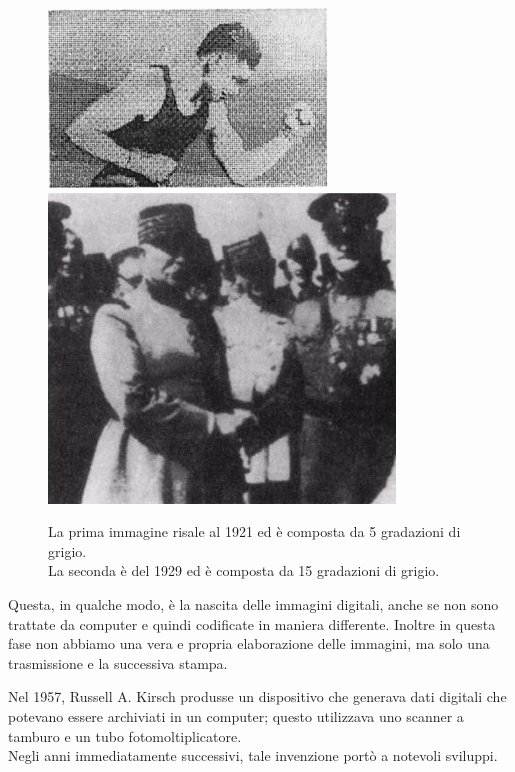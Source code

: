\begin{figure}[htb] \centering
\includegraphics[scale=0.5, trim = 0 1.1cm 0 0, clip]{Pictures/img del 1921 a 5 gradazioni di grigio.jpg}
\qquad\qquad
\includegraphics[scale=1.7, trim = 0 1.1cm 0 0, clip]{Pictures/img del 1929 a 15 gradazioni di grigio.jpg}
\caption{La prima immagine risale al 1921 ed è composta da 5 gradazioni di grigio.\\ 
La seconda è del 1929 ed è composta da 15 gradazioni di grigio.}\label{fig:figura}
\end{figure}
\vspace{1em} \noindent
Questa, in qualche modo, è la nascita delle immagini digitali, anche se non sono trattate da computer e quindi codificate in maniera differente. Inoltre in questa fase non abbiamo una vera e propria elaborazione delle immagini, ma solo una trasmissione e la successiva stampa.

\vspace{1em} \noindent
Nel 1957, Russell A. Kirsch produsse un dispositivo che generava dati digitali che potevano essere archiviati in un computer; questo utilizzava uno scanner a tamburo e un tubo fotomoltiplicatore.\\
Negli anni immediatamente successivi, tale invenzione portò a notevoli sviluppi.

